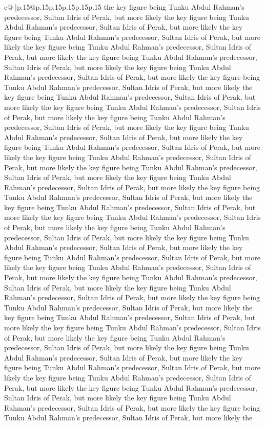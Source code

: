 \documentclass{article}
\begin{document}
{\begin{supertabular}{c@{$\;$}|p{.15\linewidth}@{}p{.15\linewidth}p{.15\linewidth}p{.15\linewidth}p{.15\linewidth}p{.15\linewidth}}
{{{the key figure being Tunku Abdul Rahman's predecessor, Sultan Idris of Perak, but more likely the key figure being Tunku Abdul Rahman's predecessor, Sultan Idris of Perak, but more likely the key figure being Tunku Abdul Rahman's predecessor, Sultan Idris of Perak, but more likely the key figure being Tunku Abdul Rahman's predecessor, Sultan Idris of Perak, but more likely the key figure being Tunku Abdul Rahman's predecessor, Sultan Idris of Perak, but more likely the key figure being Tunku Abdul Rahman's predecessor, Sultan Idris of Perak, but more likely the key figure being Tunku Abdul Rahman's predecessor, Sultan Idris of Perak, but more likely the key figure being Tunku Abdul Rahman's predecessor, Sultan Idris of Perak, but more likely the key figure being Tunku Abdul Rahman's predecessor, Sultan Idris of Perak, but more likely the key figure being Tunku Abdul Rahman's predecessor, Sultan Idris of Perak, but more likely the key figure being Tunku Abdul Rahman's predecessor, Sultan Idris of Perak, but more likely the key figure being Tunku Abdul Rahman's predecessor, Sultan Idris of Perak, but more likely the key figure being Tunku Abdul Rahman's predecessor, Sultan Idris of Perak, but more likely the key figure being Tunku Abdul Rahman's predecessor, Sultan Idris of Perak, but more likely the key figure being Tunku Abdul Rahman's predecessor, Sultan Idris of Perak, but more likely the key figure being Tunku Abdul Rahman's predecessor, Sultan Idris of Perak, but more likely the key figure being Tunku Abdul Rahman's predecessor, Sultan Idris of Perak, but more likely the key figure being Tunku Abdul Rahman's predecessor, Sultan Idris of Perak, but more likely the key figure being Tunku Abdul Rahman's predecessor, Sultan Idris of Perak, but more likely the key figure being Tunku Abdul Rahman's predecessor, Sultan Idris of Perak, but more likely the key figure being Tunku Abdul Rahman's predecessor, Sultan Idris of Perak, but more likely the key figure being Tunku Abdul Rahman's predecessor, Sultan Idris of Perak, but more likely the key figure being Tunku Abdul Rahman's predecessor, Sultan Idris of Perak, but more likely the key figure being Tunku Abdul Rahman's predecessor, Sultan Idris of Perak, but more likely the key figure being Tunku Abdul Rahman's predecessor, Sultan Idris of Perak, but more likely the key figure being Tunku Abdul Rahman's predecessor, Sultan Idris of Perak, but more likely the key figure being Tunku Abdul Rahman's predecessor, Sultan Idris of Perak, but more likely the key figure being Tunku Abdul Rahman's predecessor, Sultan Idris of Perak, but more likely the key figure being Tunku Abdul Rahman's predecessor, Sultan Idris of Perak, but more likely the key figure being Tunku Abdul Rahman's predecessor, Sultan Idris of Perak, but more likely the key figure being Tunku Abdul Rahman's predecessor, Sultan Idris of Perak, but more likely the key figure being Tunku Abdul Rahman's predecessor, Sultan Idris of Perak, but more likely the key figure being Tunku Abdul Rahman's predecessor, Sultan Idris of Perak, but more likely the key figure being Tunku Abdul Rahman's predecessor, Sultan Idris of Perak, but more likely the }}}
\end{supertabular}}
\end{document}
